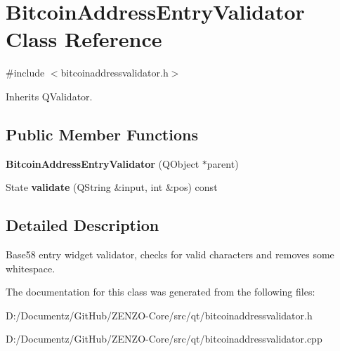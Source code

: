\hypertarget{class_bitcoin_address_entry_validator}{}\section{Bitcoin\+Address\+Entry\+Validator Class Reference}
\label{class_bitcoin_address_entry_validator}


{\ttfamily \#include $<$bitcoinaddressvalidator.\+h$>$}



Inherits Q\+Validator.

\subsection*{Public Member Functions}
\begin{DoxyCompactItemize}
\item 
\mbox{\label{class_bitcoin_address_entry_validator_ab1098be26569477a372790674841afe9}} 
{\bfseries Bitcoin\+Address\+Entry\+Validator} (Q\+Object $\ast$parent)
\item 
\mbox{\label{class_bitcoin_address_entry_validator_ab7420aad3fd2664328ce5618ee60b073}} 
State {\bfseries validate} (Q\+String \&input, int \&pos) const
\end{DoxyCompactItemize}


\subsection{Detailed Description}
Base58 entry widget validator, checks for valid characters and removes some whitespace. 

The documentation for this class was generated from the following files\+:\begin{DoxyCompactItemize}
\item 
D\+:/\+Documentz/\+Git\+Hub/\+Z\+E\+N\+Z\+O-\/\+Core/src/qt/bitcoinaddressvalidator.\+h\item 
D\+:/\+Documentz/\+Git\+Hub/\+Z\+E\+N\+Z\+O-\/\+Core/src/qt/bitcoinaddressvalidator.\+cpp\end{DoxyCompactItemize}
